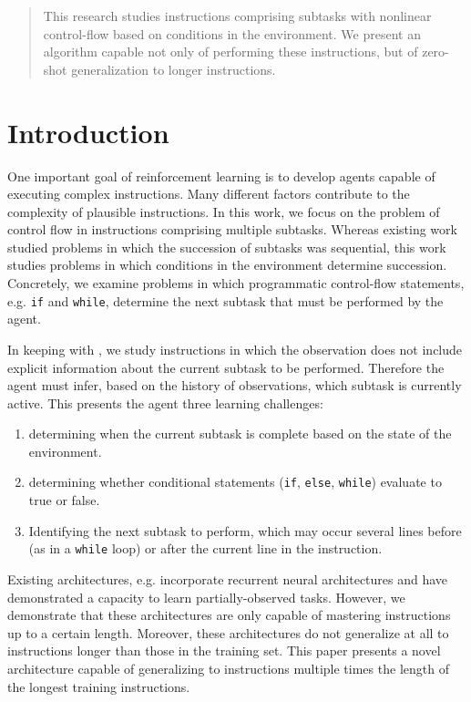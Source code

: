 \documentclass{article}
\begin{document}

\begin{abstract}
  This research studies instructions comprising subtasks with nonlinear control-flow based on conditions in
  the environment. We present an algorithm capable not only of performing these
  instructions, but of zero-shot generalization to longer instructions.
\end{abstract}

\section{Introduction}
One important goal of reinforcement learning is to develop agents capable of
executing complex instructions. Many different factors contribute to the
complexity of plausible instructions. In this work, we focus on the problem of
control flow in instructions comprising multiple subtasks. Whereas existing work
\cite{oh2017zero} studied problems in which the succession of subtasks was
sequential, this work studies problems in which conditions in the environment
determine succession. Concretely, we examine problems in which programmatic
control-flow statements, e.g. \texttt{if} and \texttt{while}, determine the next subtask
that must be performed by the agent. 

In keeping with \cite{oh2017zero}, we study instructions in which the observation does
not include explicit information about the current subtask to be performed.
Therefore the agent must infer, based on the history of observations, which
subtask is currently active. This presents the agent three learning challenges:
\begin{enumerate}
  \item determining when the current subtask is complete based on the state of
    the environment.
  \item determining whether conditional statements (\texttt{if}, \texttt{else},
    \texttt{while}) evaluate to true or false.
  \item Identifying the next subtask to perform, which may occur several lines before (as in a
    \texttt{while} loop) or after the current line in the instruction.
\end{enumerate}

Existing architectures, e.g. \cite{heess2015memory} incorporate recurrent neural
architectures and have demonstrated a capacity to learn partially-observed
tasks. However, we demonstrate that these architectures are only capable of
mastering instructions up to a certain length. Moreover, these architectures do not
generalize at all to instructions longer than those in the training set. This paper presents a novel architecture capable of generalizing
to instructions multiple times the length of the longest training instructions.
\end{document}
